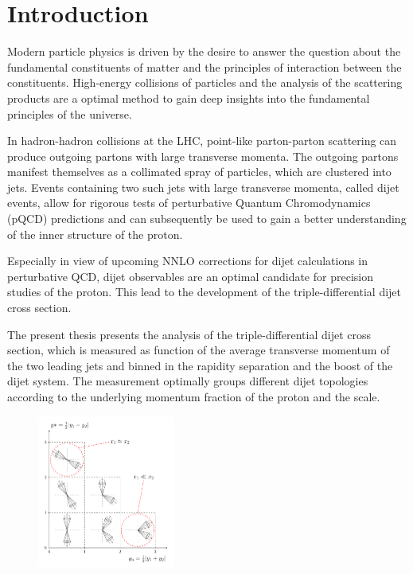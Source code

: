 
\chapter{Introduction}

Modern particle physics is driven by the desire to answer the question about the
fundamental constituents of matter and the principles of interaction between the
constituents. High-energy collisions of particles and the analysis of the
scattering products are a optimal method to gain deep insights into the
fundamental principles of the universe. 

In hadron-hadron collisions at the LHC, point-like parton-parton scattering can
produce outgoing partons with large transverse momenta. The outgoing partons
manifest themselves as a collimated spray of particles, which are clustered into
jets. Events containing two such jets with large transverse momenta, called
dijet events, allow for rigorous tests of perturbative Quantum Chromodynamics
(pQCD) predictions and can subsequently be used to gain a better understanding
of the inner structure of the proton. 

Especially in view of upcoming NNLO corrections for dijet calculations in
perturbative QCD, dijet observables are an optimal candidate for precision
studies of the proton. This lead to the development of the triple-differential
dijet cross section. 

The present thesis presents the analysis of the triple-differential dijet cross
section, which is measured as function of the average transverse momentum of the
two leading jets and binned in the rapidity separation and the boost of the
dijet system. The measurement optimally groups different dijet topologies
according to the underlying momentum fraction of the proton and the scale.


\begin{figure}[h!]
    \centering
    \includegraphics[width=0.4\textwidth]{figures/drawings/ybys_hint.pdf}
\end{figure}

